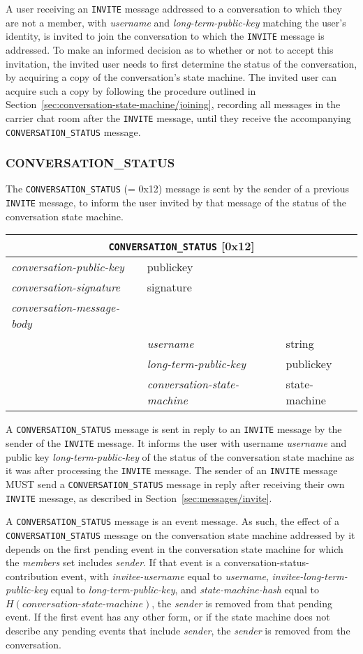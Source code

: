 \documentclass{article}
\def\message#1{\texttt{#1}}
\def\field#1{\textit{#1}}
\def\smfield#1{\textsl{#1}}
\def\type#1{\textsf{#1}}
\newenvironment{conversationmessage}[2]{
\newcommand{\messagefield}[2]{
& \field{##1} & \type{##2} \\
\hline
}
\hspace{2em minus 2em}\begin{tabular}{|l|l|l|}
\hline
\multicolumn{3}{|c|}{\message{#1} [#2]} \\
\hline
\hline
\field{conversation-public-key} & \multicolumn{2}{l|}{\type{publickey}} \\
\hline
\field{conversation-signature} & \multicolumn{2}{l|}{\type{signature}} \\
\hline
\field{conversation-message-body} & \multicolumn{2}{l|}{} \\
\hline
}{
\end{tabular}
}
\begin{document}
A user receiving an \message{INVITE} message addressed to a conversation to which they are not a member, with \field{username} and \field{long-term-public-key} matching the user's identity, is invited to join the conversation to which the \message{INVITE} message is addressed.
To make an informed decision as to whether or not to accept this invitation, the invited user needs to first determine the status of the conversation, by acquiring a copy of the conversation's state machine.
The invited user can acquire such a copy by following the procedure outlined in Section~\ref{sec:conversation-state-machine/joining}, recording all messages in the carrier chat room after the \message{INVITE} message, until they receive the accompanying \message{CONVERSATION\_STATUS} message.


\subsubsection{CONVERSATION\_STATUS}
\label{sec:messages/conversation-status}

The \message{CONVERSATION\_STATUS} (= 0x12) message is sent by the sender of a previous \message{INVITE} message, to inform the user invited by that message of the status of the conversation state machine.

\begin{conversationmessage}{CONVERSATION\_STATUS}{0x12}
\messagefield{username}{string}
\messagefield{long-term-public-key}{publickey}
\messagefield{conversation-state-machine}{state-machine}
\end{conversationmessage}

A \message{CONVERSATION\_STATUS} message is sent in reply to an \message{INVITE} message by the sender of the \message{INVITE} message.
It informs the user with username \field{username} and public key \field{long-term-public-key} of the status of the conversation state machine as it was after processing the \message{INVITE} message.
The sender of an \message{INVITE} message MUST send a \message{CONVERSATION\_STATUS} message in reply after receiving their own \message{INVITE} message, as described in Section~\ref{sec:messages/invite}.

A \message{CONVERSATION\_STATUS} message is an event message.
As such, the effect of a \message{CONVERSATION\_STATUS} message on the conversation state machine addressed by it depends on the first pending event in the conversation state machine for which the \smfield{members} set includes \field{sender}.
If that event is a \type{conversation-status-contribution} event, with \smfield{invitee-username} equal to \field{username}, \smfield{invitee-long-term-public-key} equal to \field{long-term-public-key}, and \smfield{state-machine-hash} equal to $H(\field{conversation-state-machine})$, the \field{sender} is removed from that pending event.
If the first event has any other form, or if the state machine does not describe any pending events that include \field{sender}, the \field{sender} is removed from the conversation.
\end{document}
